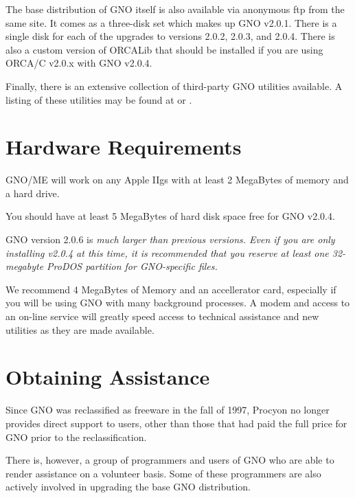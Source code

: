\documentclass{report}
\begin{document}
The base distribution of GNO itself is also available via anonymous
ftp from the same site.  It comes as a three-disk set which makes
up GNO v2.0.1.  There is a single disk for each of the upgrades
to versions 2.0.2, 2.0.3, and 2.0.4.  There is also a custom version
of ORCALib that should be installed if you are using ORCA/C v2.0.x
with GNO v2.0.4.

Finally, there is an extensive collection of third-party GNO utilities
available.  A listing of these utilities may be found at
or
.

\section{Hardware Requirements}

GNO/ME will work on any Apple IIgs with at least 2 MegaBytes of
memory and a hard drive.

You should have at least 5 MegaBytes of hard disk space free for GNO
v2.0.4.

GNO version 2.0.6 is \em much \rm larger than previous versions.
Even if you are only installing v2.0.4 at this time, it is recommended
that you reserve at least one 32-megabyte ProDOS partition for
GNO-specific files.

We recommend 4 MegaBytes of Memory and an 
accellerator card, especially if you will be using GNO with many
background processes. A modem and access to an on-line service
will greatly speed access to technical assistance and new
utilities as they are made available.

\section{Obtaining Assistance}

Since GNO was reclassified as freeware in the fall of 1997, 
Procyon no longer provides direct support to users, other than those
that had paid the full price for GNO prior to the reclassification.

There is, however, a group of programmers and users of GNO who are
able to render assistance on a volunteer basis.  Some of these programmers
are also actively involved in upgrading the base GNO distribution.
\end{document}
